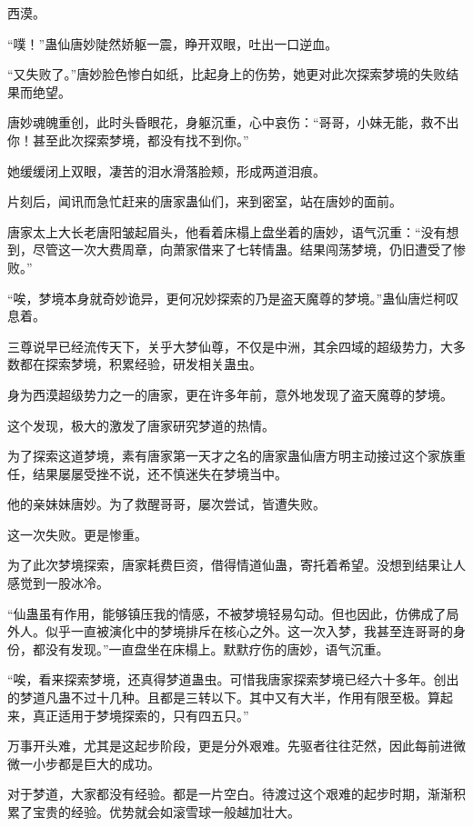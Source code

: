 
\begin{this_body}

西漠。

“噗！”蛊仙唐妙陡然娇躯一震，睁开双眼，吐出一口逆血。

“又失败了。”唐妙脸色惨白如纸，比起身上的伤势，她更对此次探索梦境的失败结果而绝望。

唐妙魂魄重创，此时头昏眼花，身躯沉重，心中哀伤：“哥哥，小妹无能，救不出你！甚至此次探索梦境，都没有找不到你。”

她缓缓闭上双眼，凄苦的泪水滑落脸颊，形成两道泪痕。

片刻后，闻讯而急忙赶来的唐家蛊仙们，来到密室，站在唐妙的面前。

唐家太上大长老唐阳皱起眉头，他看着床榻上盘坐着的唐妙，语气沉重：“没有想到，尽管这一次大费周章，向萧家借来了七转情蛊。结果闯荡梦境，仍旧遭受了惨败。”

“唉，梦境本身就奇妙诡异，更何况妙探索的乃是盗天魔尊的梦境。”蛊仙唐烂柯叹息着。

三尊说早已经流传天下，关乎大梦仙尊，不仅是中洲，其余四域的超级势力，大多数都在探索梦境，积累经验，研发相关蛊虫。

身为西漠超级势力之一的唐家，更在许多年前，意外地发现了盗天魔尊的梦境。

这个发现，极大的激发了唐家研究梦道的热情。

为了探索这道梦境，素有唐家第一天才之名的唐家蛊仙唐方明主动接过这个家族重任，结果屡屡受挫不说，还不慎迷失在梦境当中。

他的亲妹妹唐妙。为了救醒哥哥，屡次尝试，皆遭失败。

这一次失败。更是惨重。

为了此次梦境探索，唐家耗费巨资，借得情道仙蛊，寄托着希望。没想到结果让人感觉到一股冰冷。

“仙蛊虽有作用，能够镇压我的情感，不被梦境轻易勾动。但也因此，仿佛成了局外人。似乎一直被演化中的梦境排斥在核心之外。这一次入梦，我甚至连哥哥的身份，都没有发现。”一直盘坐在床榻上。默默疗伤的唐妙，语气沉重。

“唉，看来探索梦境，还真得梦道蛊虫。可惜我唐家探索梦境已经六十多年。创出的梦道凡蛊不过十几种。且都是三转以下。其中又有大半，作用有限至极。算起来，真正适用于梦境探索的，只有四五只。”

万事开头难，尤其是这起步阶段，更是分外艰难。先驱者往往茫然，因此每前进微微一小步都是巨大的成功。

对于梦道，大家都没有经验。都是一片空白。待渡过这个艰难的起步时期，渐渐积累了宝贵的经验。优势就会如滚雪球一般越加壮大。


\end{this_body}
